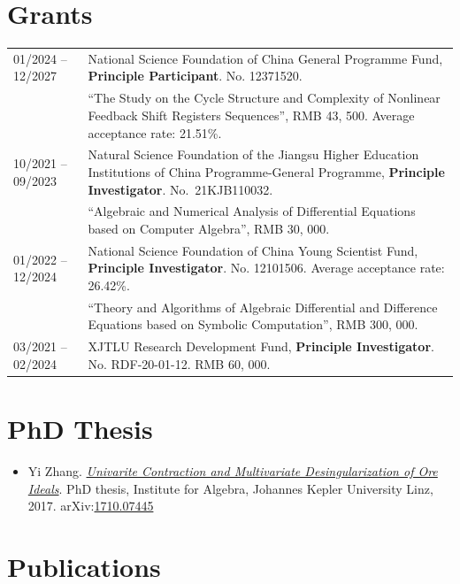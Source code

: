 \documentclass[a4paper,12pt]{article}
\begin{document}
\section*{\Large{Grants}}
\begin{tabular}{@{}p{1.4in}p{4in}}
01/2024 -- 12/2027 &National Science Foundation of China General Programme Fund, \textbf{Principle Participant}. No. 12371520. \\
                                 & ``The Study on the Cycle Structure and Complexity of Nonlinear Feedback Shift Registers Sequences'',
                                 RMB 43, 500. Average acceptance rate: 21.51\%. \\
10/2021 -- 09/2023 & Natural Science Foundation of the Jiangsu Higher Education Institutions of China Programme-General Programme, 
                                       \textbf{Principle Investigator}. No.\ 21KJB110032. \\
                                   & ``Algebraic and Numerical Analysis of Differential Equations based on Computer Algebra'', RMB 30, 000. \\     
01/2022 -- 12/2024 & National Science Foundation of China Young Scientist Fund, \textbf{Principle Investigator}. No. 12101506. Average acceptance rate: 26.42\%. \\
                                 & ``Theory and Algorithms of Algebraic Differential and Difference Equations based on Symbolic Computation'',
                                 RMB 300, 000. \\
03/2021 -- 02/2024    & XJTLU Research Development Fund, \textbf{Principle Investigator}. No. RDF-20-01-12. RMB 60, 000.

\end{tabular}

\section*{\Large{PhD Thesis}}
\begin{itemize}
 \item Yi Zhang. \href{https://yzhang1616.github.io/yzhang_PhDthesis_final.pdf}{{\em Univarite 
                Contraction and Multivariate Desingularization of Ore Ideals}}. 
                PhD thesis, Institute for Algebra, Johannes Kepler University Linz, 2017. 
                arXiv:\href{https://arxiv.org/abs/1710.07445}{1710.07445}
\end{itemize}

\section*{\Large{Publications}}
\end{document}
